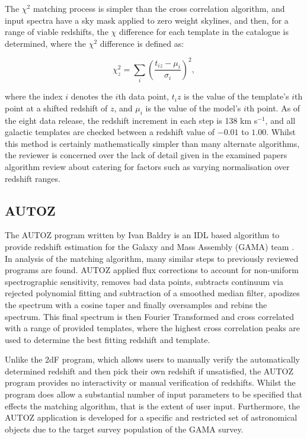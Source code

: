 \documentclass[titlesmallcaps, examinerscopy, copyrightpage]{uqthesis}
\begin{document}
The $\chi^2$ matching process is simpler than the cross correlation algorithm, and input spectra have a sky mask applied to zero weight skylines, and then, for a range of viable redshifts, the $\chi$ difference for each template in the catalogue is determined, where the $\chi^2$ difference is defined as:

\begin{equation}
\chi^2_z = \sum_i \left(\frac{t_{iz} - \mu_i}{\sigma_i} \right)^2,
\end{equation}

where the index $i$ denotes the $i$th data point, $t_iz$ is the value of the template's $i$th point at a shifted redshift of $z$, and $\mu_i$ is the value of the model's $i$th point. As of the eight data release, the redshift increment in each step is 138 km s$^{-1}$, and all galactic templates are checked between a redshift value of $-0.01$ to $1.00$. Whilst this method is certainly mathematically simpler than many alternate algorithms, the reviewer is concerned over the lack of detail given in the examined papers algorithm review about catering for factors such as varying normalisation over redshift ranges.



\subsection{\textsc{AUTOZ}}

The \textsc{AUTOZ} program written by Ivan Baldry is an IDL based algorithm to provide redshift estimation for the Galaxy and Mass Assembly (GAMA) team \cite{baldry2014galaxy}. In analysis of the matching algorithm, many similar steps to previously reviewed programs are found. \textsc{AUTOZ} applied flux corrections to account for non-uniform spectrographic sensitivity, removes bad data points, subtracts continuum via rejected polynomial fitting and subtraction of a smoothed median filter, apodizes the spectrum with a cosine taper and finally oversamples and rebins the spectrum. This final spectrum is then Fourier Transformed and cross correlated with a range of provided templates, where the highest cross correlation peaks are used to determine the best fitting redshift and template.

Unlike the 2dF program, which allows users to manually verify the automatically determined redshift and then pick their own redshift if unsatisfied, the \textsc{AUTOZ} program provides no interactivity or manual verification of redshifts. Whilst the program does allow a substantial number of input parameters to be specified that effects the matching algorithm, that is the extent of user input. Furthermore, the \textsc{AUTOZ} application is developed for a specific and restricted set of astronomical objects due to the target survey population of the GAMA survey.
\end{document}
